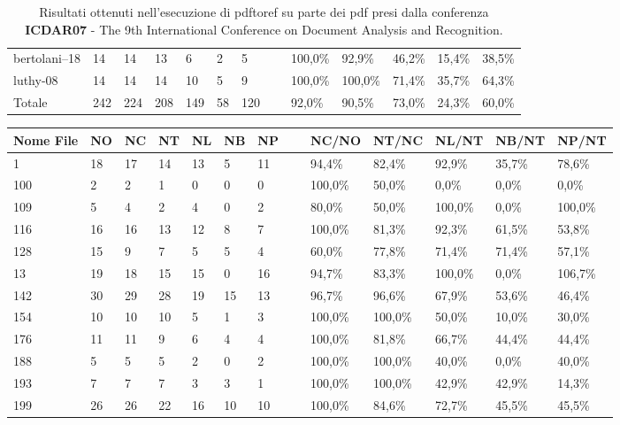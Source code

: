 \begin{table}
\begin{center}
\begin{tabular}{|l|l|l|l|l|l|l|l|l|l|l|l|l|}
bertolani--18 & 14 & 14 & 13 & 6 & 2 & 5 & ~ & 100,0\% & 92,9\% & 46,2\% & 15,4\% & 38,5\%\\
luthy-08 & 14 & 14 & 14 & 10 & 5 & 9 & ~ & 100,0\% & 100,0\% & 71,4\% & 35,7\% & 64,3\%\\ \hline
Totale & 242 & 224 & 208 & 149 & 58 & 120 & ~ & 92,0\% & 90,5\% & 73,0\% & 24,3\% & 60,0\%\\ \hline
	\end{tabular}
	\end{center}
	\tiny{\caption{Risultati ottenuti nell'esecuzione di pdftoref su parte dei pdf presi dalla conferenza \textbf{ICDAR07} - The 9th International Conference on Document Analysis and Recognition. }}
		\label{tab:icdar}
	\end{table}

	\begin{table}\label{tab:grec}
	\begin{center}
	\begin{tabular}{|l|l|l|l|l|l|l|l|l|l|l|l|l|} \hline
Nome File & NO & NC & NT & NL & NB & NP & ~ & NC/NO & NT/NC & NL/NT & NB/NT & NP/NT \\ \hline
1 & 18 & 17 & 14 & 13 & 5 & 11 & ~ & 94,4\% & 82,4\% & 92,9\% & 35,7\% & 78,6\%\\
100 & 2 & 2 & 1 & 0 & 0 & 0 & ~ & 100,0\% & 50,0\% & 0,0\% & 0,0\% & 0,0\%\\
109 & 5 & 4 & 2 & 4 & 0 & 2 & ~ & 80,0\% & 50,0\% & 100,0\% & 0,0\% & 100,0\%\\
116 & 16 & 16 & 13 & 12 & 8 & 7 & ~ & 100,0\% & 81,3\% & 92,3\% & 61,5\% & 53,8\%\\
128 & 15 & 9 & 7 & 5 & 5 & 4 & ~ & 60,0\% & 77,8\% & 71,4\% & 71,4\% & 57,1\%\\
13 & 19 & 18 & 15 & 15 & 0 & 16 & ~ & 94,7\% & 83,3\% & 100,0\% & 0,0\% & 106,7\%\\
142 & 30 & 29 & 28 & 19 & 15 & 13 & ~ & 96,7\% & 96,6\% & 67,9\% & 53,6\% & 46,4\%\\
154 & 10 & 10 & 10 & 5 & 1 & 3 & ~ & 100,0\% & 100,0\% & 50,0\% & 10,0\% & 30,0\%\\
176 & 11 & 11 & 9 & 6 & 4 & 4 & ~ & 100,0\% & 81,8\% & 66,7\% & 44,4\% & 44,4\%\\
188 & 5 & 5 & 5 & 2 & 0 & 2 & ~ & 100,0\% & 100,0\% & 40,0\% & 0,0\% & 40,0\%\\
193 & 7 & 7 & 7 & 3 & 3 & 1 & ~ & 100,0\% & 100,0\% & 42,9\% & 42,9\% & 14,3\%\\
199 & 26 & 26 & 22 & 16 & 10 & 10 & ~ & 100,0\% & 84,6\% & 72,7\% & 45,5\% & 45,5\%\\

\end{tabular}
\end{center}
\end{table}
